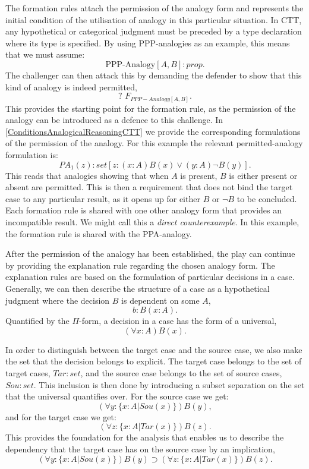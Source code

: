 			The formation rules attach the permission of the analogy form and represents the initial condition of the utilisation of analogy in this particular situation. In CTT, any hypothetical or categorical judgment must be preceded by a type declaration where its type is specified. By using PPP-analogies as an example, this means that we must assume:
				\[
				\text{PPP-Analogy}[A,B] : prop. 
				\]
			The challenger can then attack this by demanding the defender to show that this kind of analogy is indeed permitted, 
				\[
				\text{? }F_{PPP-Analogy[A,B]}.
				\]
			 This provides the starting point for the formation rule, as the permission of the analogy can be introduced as a defence to this challenge. In \autoref{ConditionsAnalogicalReasoningCTT} we provide the corresponding formulations of the permission of the analogy. For this example the relevant permitted-analogy formulation is:
			 	\[
			 	PA_1(z) : set [z : (x : A)B(x) \lor (y : A) \neg B(y)]. 
			 	\]
			 This reads that analogies showing that when $A$ is present, $B$ is either present or absent are permitted. This is then a requirement that does not bind the target case to any particular result, as it opens up for either $B$ or $\neg B$ to be concluded. Each formation rule is shared with one other analogy form that provides an incompatible result. We might call this a \textit{direct counterexample}. In this example, the formation rule is shared with the PPA-analogy. 
			 
			 After the permission of the analogy has been established, the play can continue by providing the explanation rule regarding the chosen analogy form. The explanation rules are based on the formulation of particular decisions in a case. Generally, we can then describe the structure of a case as a hypothetical judgment where the decision $B$ is dependent on some $A$,
				\[
					b : B(x : A).
				\]
			Quantified by the $\Pi$-form, a decision in a case has the form of a universal,
				\[
					(\forall x : A)B(x).
				\]
			
			In order to distinguish between the target case and the source case, we also make the set that the decision belongs to explicit. The target case belongs to the set of target cases, $Tar : set$, and the source case belongs to the set of source cases, $Sou : set$. This inclusion is then done by introducing a subset separation on the set that the universal quantifies over. For the source case we get:
				\[
					(\forall y : \{ x : A | Sou(x) \} ) B(y),
				\]
			and for the target case we get: 
				\[
					(\forall z : \{ x : A | Tar(x) \} ) B(z).
				\]
			This provides the foundation for the analysis that enables us to describe the dependency that the target case has on the source case by an implication,
				\[
					(\forall y: \{ x: A| Sou(x)\} ) B(y) \supset (\forall z : \{ x: A| Tar(x)\} ) B(z).
				\]
			
